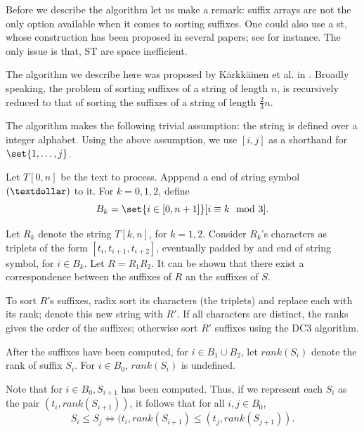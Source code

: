 \documentclass{subfiles}
\begin{document}
\label{sec:DC3}
    Before we describe the algorithm let us make a remark: suffix arrays are 
        not the only option available when it comes to sorting suffixes.
        One could also use a \gls{st}, whose construction has been proposed 
        in several papers; see \cite{farach1997,farachM1996,mccreight1976,ukkonen1995} 
        for instance. The only issue is that, ST are space inefficient.

    The algorithm we describe here was proposed by K{\"a}rkk{\"a}inen et al. in 
        \cite{karkkainenSB2006}. Broadly speaking, the problem of sorting 
        suffixes of a string of length \(n\), 
        is recursively reduced to that of sorting the suffixes of a string of
        length \(\frac{2}{3}n\).

    The algorithm makes the following trivial assumption:
        the string is defined over a integer alphabet.
        Using the above assumption, we use \([i, j]\) as a shorthand for \(\set{1, \ldots, j}\).

    Let \(T[0, n]\) be the text to process. Apppend a end of string symbol \((\textdollar)\)
        to it. For \(k = 0, 1, 2\), define
        \[
            B_{k} = \set{i \in [0, n + 1]}[i \equiv k \mod{3}].
        \]

    Let \(R_{k}\) denote the string \(T[k, n]\), for \(k = 1, 2\). 
        Consider \(R_{k}\)'s characters as triplets of the form \([t_{i}, t_{i + 1}, t_{i + 2}]\),
        eventually padded by and end of string symbol, for \(i \in B_{k}\).
        Let \(R = R_{1}R_{2}\). It can be shown that there exist a correspondence 
        between the suffixes of \(R\) an the suffixes of \(S\).
    
    To sort \(R\)'s suffixes, radix sort its characters (the triplets) and replace 
        each with its rank; denote this new string with \(R'\).
        If all characters are distinct, the ranks gives the order of the suffixes;
        otherwise sort \(R'\) suffixes using the DC3 algorithm.

    After the suffixes have been computed, for \(i \in B_{1} \cup B_{2}\), let 
        \(rank(S_{i})\) denote the rank of suffix \(S_{i}\). For \(i \in B_{0}\),
        \(rank(S_{i})\) is undefined.

    Note that for \(i \in B_{0}, S_{i + 1}\) has been computed.
        Thus, if we represent each \(S_{i}\) as the pair \((t_{i}, rank(S_{i + 1}))\),
        it follows that for all \(i, j \in B_{0}\),
        \[
            S_{i} \le S_{j} \iff (t_{i}, rank(S_{i + 1}) \le (t_{j}, rank(S_{j + 1})). 
        \]
    
\end{document}
